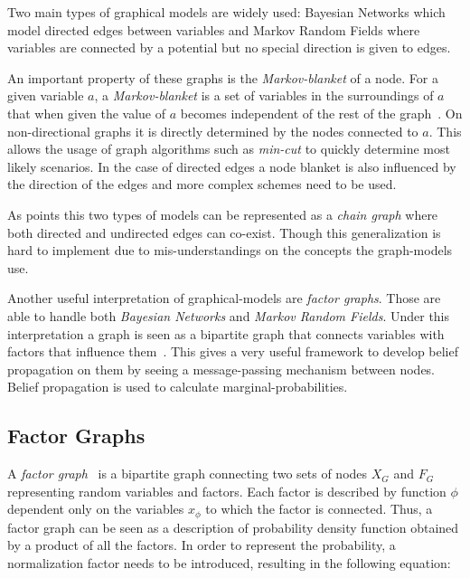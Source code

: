 Two main types of graphical models are widely used: Bayesian Networks which model
directed edges between variables and Markov Random Fields where variables are
connected by a potential but no special direction is given to edges.

An important property of these graphs is the \emph{Markov-blanket} of a node.
For a given variable $a$, a \emph{Markov-blanket} is a set of variables in the
surroundings of $a$ that when given the value of $a$ becomes independent of the
rest of the graph~\citep{pearl1988probabilistic}.
On non-directional graphs it is directly determined by the nodes connected to $a$.
This allows the usage of graph algorithms such as \emph{min-cut} to quickly
determine most likely scenarios. In the case of directed edges a node blanket is
also influenced by the direction of the edges and more complex schemes need to
be used.

As \cite{lauritzen2002chain} points this two types of models can be represented
as a \emph{chain graph} where both directed and undirected edges can co-exist.
Though this generalization is hard to implement due to mis-understandings on the
concepts the graph-models use.

Another useful interpretation of graphical-models are \emph{factor graphs}.
Those are able to handle both \emph{Bayesian Networks} and
\emph{Markov Random Fields}. Under this interpretation a graph is seen as a
bipartite graph that connects variables with factors that influence
them~\citep{bishop2006pattern}.
This gives a very useful framework to develop belief propagation on them by
seeing a message-passing mechanism between nodes. Belief propagation is used to
calculate marginal-probabilities.

\begin{figure}[ht]
\centering

\quad
{}
\quad
{}
\end{figure}

\subsection{Factor Graphs}
A \emph{factor graph}~\cite{kschischang2001factor} is a bipartite graph connecting two sets of nodes $X_G$ and $F_G$
representing random variables and factors.
Each factor is described by function $\phi$ dependent only on the variables $x_\phi$
to which the factor is connected.
Thus, a factor graph can be seen as a description of probability density function obtained
by a product of all the factors. In order to represent the probability,
a normalization factor needs to be introduced, resulting in the following equation:

